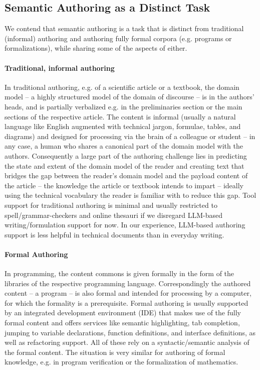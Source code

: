 \documentclass[runningheads]{llncs}
\begin{document}
\subsection{Semantic Authoring as a Distinct Task}
We contend that semantic authoring is a task that is distinct from traditional
(informal) authoring and authoring fully formal corpora (e.g. programs or formalizations),
while sharing some of the aspects of either.

\paragraph{Traditional, informal authoring}
In traditional authoring, e.g. of a scientific article or a textbook, the domain model --
a highly structured model of the domain of discourse -- is in the authors' heads, and is
partially verbalized e.g. in the preliminaries section or the main sections of the
respective article. The content is informal (usually a natural language like English
augmented with technical jargon, formulae, tables, and diagrams) and designed for
processing via the brain of a colleague or student -- in any case, a human who shares a
canonical part of the domain model with the authors. Consequently a large part of the
authoring challenge lies in predicting the state and extent of the domain model of the
reader and creating text that bridges the gap between the reader's domain model and the
payload content of the article -- the knowledge the article or textbook intends to impart
-- ideally using the technical vocabulary the reader is familiar with to reduce this
gap. Tool support for traditional authoring is minimal and usually restricted to
spell/grammar-checkers and online thesauri if we disregard LLM-based writing/formulation
support for now.
In our experience, LLM-based authoring support is less helpful in technical documents
than in everyday writing.

\paragraph{Formal Authoring}
In programming, the content commons is given formally in the form of the libraries of the
respective programming language. Correspondingly the authored content -- a program -- is
also formal and intended for processing by a computer, for which the formality is a
prerequisite. Formal authoring is usually supported by an integrated development
environment (IDE) that makes use of the fully formal content and offers services like
semantic highlighting, tab completion, jumping to variable declarations, function
definitions, and interface definitions, as well as refactoring support. All of these rely
on a syntactic/semantic analysis of the formal content. The situation is very similar for
authoring of formal knowledge, e.g. in program verification or the formalization of
mathematics.
\end{document}

